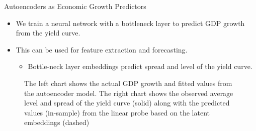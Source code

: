 \documentclass[
  10pt,
  ignorenonframetext,
  aspectratio=169,
  notheorems]{beamer}
\providecommand{\tightlist}{%
  \setlength{\itemsep}{0pt}\setlength{\parskip}{0pt}}\usepackage{longtable,booktabs,array}
\begin{document}
\begin{frame}{Autoencoders as Economic Growth Predictors}
\label{autoencoders-as-economic-growth-predictors}
\begin{itemize}
\tightlist
\item
  We train a neural network with a bottleneck layer to predict GDP
  growth from the yield curve.
\item
  This can be used for feature extraction and forecasting.

  \begin{itemize}
  \tightlist
  \item
    Bottle-neck layer embeddings predict spread and level of the yield
    curve.
  \end{itemize}
\end{itemize}

\begin{figure}


\caption{\label{fig-dl}The left chart shows the actual GDP growth and
fitted values from the autoencoder model. The right chart shows the
observed average level and spread of the yield curve (solid) along with
the predicted values (in-sample) from the linear probe based on the
latent embeddings (dashed)}

\end{figure}%
\end{frame}
\end{document}
